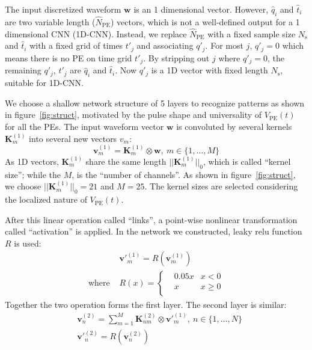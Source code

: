 The input discretized waveform $\bm{w}$ is an 1 dimensional vector.  However, $\hat{q}_i$ and $\hat{t}_i$ are two variable length ($\hat{N}_\mathrm{PE}$) vectors, which is not a well-defined output for a 1 dimensional CNN (1D-CNN).  Instead, we replace $\hat{N}_\mathrm{PE}$ with a fixed sample size $N_\mathrm{s}$ and $\hat{t}_i$ with a fixed grid of times $t'_j$ and associating $q'_j$. For most $j$, $q'_j = 0$ which means there is no PE on time grid $t'_j$. By stripping out $j$ where $q'_j=0$, the remaining $q'_j$, $t'_j$ are $\hat{q}_i$ and $\hat{t}_i$.  Now $q'_j$ is a 1D vector with fixed length $N_\mathrm{s}$, suitable for 1D-CNN.

We choose a shallow network structure of 5 layers to recognize patterns as shown in figure~\ref{fig:struct}, motivated by the pulse shape and universality of $V_\mathrm{PE}(t)$ for all the PEs. The input waveform vector $\bm{w}$ is convoluted by several kernels $\bm{K}^{(1)}_m$ into several new vectors $v_m$:
\begin{equation}
  \bm{v}^{(1)}_m = \bm{K}^{(1)}_m \otimes \bm{w},\ m\in \{1,\ldots,M\}
  \label{eq:1DCNN-11}
\end{equation}
As 1D vectors, $\bm{K}^{(1)}_m$ share the same length $||\bm{K}^{(1)}_m||_0$, which is called ``kernel size''; while the $M$, is the ``number of channels''. As shown in figure~\ref*{fig:struct}, we choose $||\bm{K}^{(1)}_m||_0 = 21$ and $M=25$. The kernel sizes are selected considering the localized nature of $V_\mathrm{PE}(t)$.  

After this linear operation called ``links'', a point-wise nonlinear transformation called ``activation'' is applied. In the network we constructed, leaky relu function $R$ is used:
\begin{equation}
  \begin{aligned}
    & \bm{v'}^{(1)}_m = R(\bm{v}^{(1)}_m) \\
    \text{where  } & R(x) = \left\{ \begin{aligned}
      & 0.05 x & x<0 \\
      & x & x\geqslant 0 \\
    \end{aligned} \right.
  \end{aligned}
  \label{eq:1DCNN-12}
\end{equation}
Together the two operation forms the first layer. The second layer is similar:
\begin{equation}
  \begin{aligned}
    & \bm{v}^{(2)}_n = \sum_{m=1}^{M} \bm{K}^{(2)}_{nm} \otimes \bm{v'}^{(1)}_m,\ n\in \{1,\ldots,N\} \\
    & \bm{v'}^{(2)}_n = R(\bm{v}^{(2)}_n) \\
  \end{aligned}
  \label{eq:1DCNN-2}
\end{equation}

